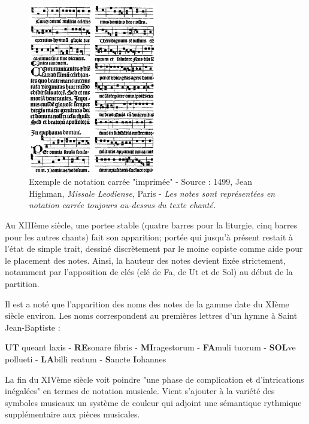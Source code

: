 \begin{figure}[H]
	\centering
	\includegraphics[keepaspectratio=true, width=0.5\textwidth]{Notation/i/notationCarree.jpg}
	\caption{Exemple de notation carrée "imprimée" - Source : 1499, Jean Highman, \textit{Missale Leodiense}, Paris - \textit{Les notes sont représentées en notation carrée toujours au-dessus du texte chanté.} }
	\label{fig:notationCarree}
\end{figure}

Au XIIIème siècle, une \gls{portee} stable (quatre barres pour la liturgie, cinq barres pour les autres chants) fait son apparition; portée qui jusqu'à présent restait à l'état de simple trait, dessiné discrètement par le moine copiste comme aide pour le placement des notes. Ainsi, la hauteur des notes devient fixée strictement, notamment par l'apposition de clés (clé de Fa, de Ut et de Sol) au début de la partition.

Il est a noté que l'apparition des noms des notes de la gamme date du XIème siècle environ. Les noms correspondent au premières lettres d'un hymne à Saint Jean-Baptiste :

\begin{center}
	\textbf{UT} queant laxis - \textbf{RE}sonare fibris - \textbf{MI}ragestorum - \textbf{FA}muli tuorum -  \textbf{SOL}ve pollueti - \textbf{LA}billi reatum - \textbf{S}ancte \textbf{I}ohannes
\end{center}

La fin du XIVème siècle voit poindre "une phase de complication et d'intrications inégalées"\cite{bosseur2005} en termes de notation musicale. Vient s'ajouter à la variété des symboles musicaux un système de couleur qui adjoint une sémantique rythmique supplémentaire aux pièces musicales.

